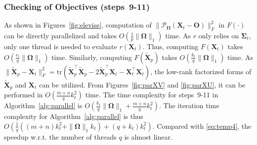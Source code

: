 \documentclass[10pt,journal,compsoc]{IEEEtran}
\newcommand{\X}{\mathbf{X}}
\newcommand{\NM}[2]{\| #1 \|_{#2} }
\newcommand{\SO}[1]{\mathcal{P}_{\mathbf{\Omega}}(#1)}
\newcommand{\Tr}[1]{\text{tr}( #1 ) }
\begin{document}
\subsubsection{Checking of Objectives (steps~9-11)}
\label{sec:chkobj}

As shown in Figures~\ref{fig:elevise},
computation of $\NM{\SO{\mathbf{X}_t - \mathbf{O}}}{F}^2$ in $F(\cdot)$
can be directly parallelized and takes 
$O(\frac{1}{p}\NM{\mathbf{\Omega}}{1})$ time.
As $r$ only relies on $\mathbf{\Sigma}_t$, 
only one thread is needed to evaluate $r(\X_t)$.
Thus, computing $F(\X_t)$ takes $O( \frac{r_t}{q} \NM{\mathbf{\Omega}}{1} )$ time.
Similarly,
computing $F( \tilde{\mathbf{X}}_p )$
takes $O( \frac{k_t}{q} \NM{\mathbf{\Omega}}{1} )$ time.
As $\NM{\tilde{\X}_p - \mathbf{X}_t}{F}^2 
= \Tr{\tilde{\X}_p^{\top} \tilde{\X}_p - 2 \tilde{\mathbf{X}}_p^{\top} \mathbf{X}_t -
\mathbf{X}_t^{\top} \mathbf{X}_t}$, the low-rank factorized forms of $\tilde{\mathbf{X}}_p$ and $\mathbf{X}_t$ can be utilized.
From Figures~\ref{fig:parXV} and 
\ref{fig:parXU}, 
it can be performed in $O(\frac{m + n}{q} k_t^2 )$ time.
The time complexity for steps~9-11 in Algorithm~\ref{alg:parallel} is
$O(\frac{k_t}{q}\NM{\mathbf{\Omega}}{1}
+ \frac{m + n}{q}k_t^2)$.
The iteration time complexity for Algorithm~\ref{alg:parallel} is thus
$O( 
\frac{1}{q}((m + n) k_t^2
+ 
\NM{\mathbf{\Omega}}{1} k_t)
+ 
(q + k_t) k_t^2)$.
Compared with \eqref{eq:temp4},
the speedup w.r.t. the number of threads $q$
is almost linear.
\end{document}
